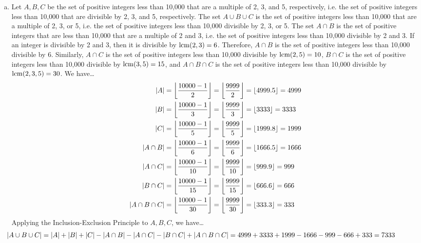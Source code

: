 \documentclass[11pt,letterpaper]{article}
\begin{document}
\begin{enumerate}[(a)]
\item Let $A, B, C$ be the set of positive integers less than 10,000 that are a multiple of 2, 3, and 5, respectively, i.e. the set of positive integers less than 10,000 that are divisible by 2, 3, and 5, respectively. The set $A \cup B \cup C$ is the set of positive integers less than 10,000 that are a multiple of 2, 3, or 5, i.e. the set of positive integers less than 10,000 divisible by 2, 3, or 5. The set $A \cap B$ is the set of positive integers that are less than 10,000 that are a multiple of 2 and 3, i.e. the set of positive integers less than 10,000 divisible by 2 and 3. If an integer is divisible by 2 and 3, then it is divisible by $\lcm(2, 3)= 6$. Therefore, $A \cap B$ is the set of positive integers less than 10,000 divisible by 6. Similarly, $A \cap C$ is the set of positive integers less than 10,000 divisible by $\lcm(2, 5)= 10$, $B \cap C$ is the set of positive integers less than 10,000 divisible by $\lcm(3, 5)= 15$, and $A \cap B \cap C$ is the set of positive integers less than 10,000 divisible by $\lcm(2, 3, 5)= 30$. We have\dots
	\[
	\begin{aligned}
	|A|&= \floor*{\dfrac{10000 - 1}{2}}= \floor*{\dfrac{9999}{2}}= \floor*{4999.5}= 4999 \\
	|B|&= \floor*{\dfrac{10000 - 1}{3}}= \floor*{\dfrac{9999}{3}}= \floor*{3333}= 3333 \\
	|C|&= \floor*{\dfrac{10000 - 1}{5}}= \floor*{\dfrac{9999}{5}}= \floor*{1999.8}= 1999 \\
	|A \cap B|&= \floor*{\dfrac{10000 - 1}{6}}= \floor*{\dfrac{9999}{6}}= \floor*{1666.5}= 1666 \\
	|A \cap C|&= \floor*{\dfrac{10000 - 1}{10}}= \floor*{\dfrac{9999}{10}}= \floor*{999.9}= 999 \\
	|B \cap C|&= \floor*{\dfrac{10000 - 1}{15}}= \floor*{\dfrac{9999}{15}}= \floor*{666.6}= 666 \\
	|A \cap B \cap C|&= \floor*{\dfrac{10000 - 1}{30}}= \floor*{\dfrac{9999}{30}}= \floor*{333.3}= 333
	\end{aligned}
	\]
Applying the Inclusion-Exclusion Principle to $A, B, C$, we have\dots
	\[
	\hspace{-1.5cm} |A \cup B \cup C|= |A| + |B| + |C| - |A \cap B| - |A \cap C| - |B \cap C| + |A \cap B \cap C|= 4999 + 3333 + 1999 - 1666 - 999 - 666 + 333= 7333
	\]
\end{enumerate}
\end{document}
